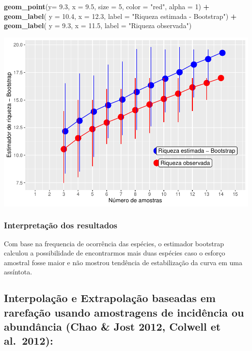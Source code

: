 \documentclass[
]{book}
\newenvironment{Shaded}{\begin{snugshade}}{\end{snugshade}}
\newcommand{\DataTypeTok}[1]{\textcolor[rgb]{0.13,0.29,0.53}{#1}}
\newcommand{\DecValTok}[1]{\textcolor[rgb]{0.00,0.00,0.81}{#1}}
\newcommand{\FloatTok}[1]{\textcolor[rgb]{0.00,0.00,0.81}{#1}}
\newcommand{\KeywordTok}[1]{\textcolor[rgb]{0.13,0.29,0.53}{\textbf{#1}}}
\newcommand{\NormalTok}[1]{#1}
\newcommand{\OperatorTok}[1]{\textcolor[rgb]{0.81,0.36,0.00}{\textbf{#1}}}
\newcommand{\StringTok}[1]{\textcolor[rgb]{0.31,0.60,0.02}{#1}}
\begin{document}
\begin{Shaded}
\begin{Highlighting}[]
\StringTok{  }\KeywordTok{geom_point}\NormalTok{(}\DataTypeTok{y=} \FloatTok{9.3}\NormalTok{, }\DataTypeTok{x =} \FloatTok{9.5}\NormalTok{, }\DataTypeTok{size =} \DecValTok{5}\NormalTok{, }\DataTypeTok{color =} \StringTok{"red"}\NormalTok{, }\DataTypeTok{alpha =} \DecValTok{1}\NormalTok{) }\OperatorTok{+}\StringTok{ }
\StringTok{  }\KeywordTok{geom_label}\NormalTok{( }\DataTypeTok{y =} \FloatTok{10.4}\NormalTok{, }\DataTypeTok{x =} \FloatTok{12.3}\NormalTok{, }\DataTypeTok{label =} \StringTok{"Riqueza estimada - Bootstrap"}\NormalTok{) }\OperatorTok{+}
\StringTok{  }\KeywordTok{geom_label}\NormalTok{( }\DataTypeTok{y =} \FloatTok{9.3}\NormalTok{, }\DataTypeTok{x =} \FloatTok{11.5}\NormalTok{, }\DataTypeTok{label =} \StringTok{"Riqueza observada"}\NormalTok{)}
\end{Highlighting}
\end{Shaded}

\includegraphics{livro_r_ecologia_files/figure-latex/unnamed-chunk-31-1.pdf}

\hypertarget{interpretauxe7uxe3o-dos-resultados-5}{%
\subsubsection{Interpretação dos resultados}\label{interpretauxe7uxe3o-dos-resultados-5}}

Com base na frequencia de ocorrência das espécies, o estimador bootstrap calculou a possibilidade de encontrarmos mais duas espécies caso o esforço amostral fosse maior e não mostrou tendência de estabilização da curva em uma assíntota.

\hypertarget{interpolauxe7uxe3o-e-extrapolauxe7uxe3o-baseadas-em-rarefauxe7uxe3o-usando-amostragens-de-inciduxeancia-ou-abunduxe2ncia-chao-jost-2012-colwell-et-al.-2012}{%
\subsection{Interpolação e Extrapolação baseadas em rarefação usando amostragens de incidência ou abundância (Chao \& Jost 2012, Colwell et al.~2012):}\label{interpolauxe7uxe3o-e-extrapolauxe7uxe3o-baseadas-em-rarefauxe7uxe3o-usando-amostragens-de-inciduxeancia-ou-abunduxe2ncia-chao-jost-2012-colwell-et-al.-2012}}
\end{document}

